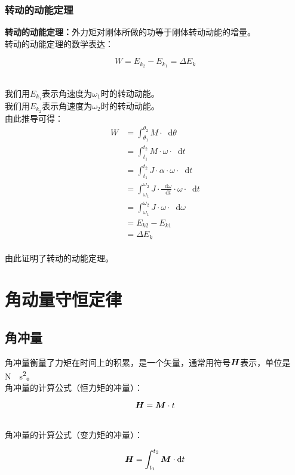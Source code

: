 \documentclass[UTF8]{ctexart}
\newcommand*{\veb}[1]{\vb*{#1}}
\newcommand*{\dif}{\mathop{}\!\mathrm{d}}
\begin{document}
\subsubsection{转动的动能定理}
    \textbf{转动的动能定理：}外力矩对刚体所做的功等于刚体转动动能的增量。\\[3mm]
    转动的动能定理的数学表达：
    \begin{large}
        \begin{equation*}
            W=E_{k_2}-E_{k_1}=\Delta E_k
        \end{equation*}
    \end{large}\\
    我们用$E_{k_1}$表示角速度为$\omega_1$时的转动动能。\\[3mm]
    我们用$E_{k_2}$表示角速度为$\omega_2$时的转动动能。\\[3mm]
    由此推导可得：
    \setcounter{equation}{0}
    \begin{align}
        W
        &=\int_{\theta_1}^{\theta_2}M\cdot\dif\theta\\[3mm]
        &=\int_{t_1}^{t_2}M\cdot\omega\cdot\dif t\\[3mm]
        &=\int_{t_1}^{t_2}J\cdot\alpha\cdot\omega\cdot\dif t\\[3mm]
        &=\int_{\omega_1}^{\omega_2}J\cdot\frac{\dif\omega}{\dif t}\cdot\omega\cdot\dif t\\[3mm]
        &=\int_{\omega_1}^{\omega_2}J\cdot\omega\cdot\dif\omega\\[3mm]
        &=E_{k2}-E_{k1}\\[3mm]
        &=\Delta E_k
    \end{align}\\
    由此证明了转动的动能定理。

\newpage

\section{角动量守恒定律}

\subsection{角冲量}
    角冲量衡量了力矩在时间上的积累，是一个矢量，通常用符号$\veb{H}$表示，单位是\si{N\cdot s^2}。\\[3mm]
    角冲量的计算公式（恒力矩的冲量）：
    \begin{large}
        \begin{equation*}
            \veb{H}=\veb{M}\cdot t
        \end{equation*}
    \end{large}\\
    角冲量的计算公式（变力矩的冲量）：
    \begin{large}
        \begin{equation*}
            \veb{H}=\int_{t_1}^{t_2}\veb{M}\cdot\dif t
        \end{equation*}
    \end{large}
\end{document}
